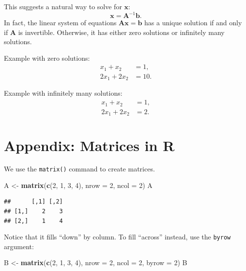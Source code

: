 \documentclass[12pt,oneside,openany]{book}
\newenvironment{Shaded}{\begin{snugshade}}{\end{snugshade}}
\newcommand{\KeywordTok}[1]{\textcolor[rgb]{0.13,0.29,0.53}{\textbf{{#1}}}}
\newcommand{\DataTypeTok}[1]{\textcolor[rgb]{0.13,0.29,0.53}{{#1}}}
\newcommand{\DecValTok}[1]{\textcolor[rgb]{0.00,0.00,0.81}{{#1}}}
\newcommand{\StringTok}[1]{\textcolor[rgb]{0.31,0.60,0.02}{{#1}}}
\newcommand{\NormalTok}[1]{{#1}}
\begin{document}
This suggests a natural way to solve for \(\mathbf{x}\):
\[\mathbf{x} = \mathbf{A}^{-1} \mathbf{b}.\] In fact, the linear system
of equations \(\mathbf{A} \mathbf{x} = \mathbf{b}\) has a unique
solution if and only if \(\mathbf{A}\) is invertible. Otherwise, it has
either zero solutions or infinitely many solutions.

Example with zero solutions: \[
\begin{aligned}
x_1 + x_2 &= 1, \\
2 x_1 + 2 x_2 &= 10.
\end{aligned}
\]

Example with infinitely many solutions: \[
\begin{aligned}
x_1 + x_2 &= 1, \\
2 x_1 + 2 x_2 &= 2.
\end{aligned}
\]

\section{Appendix: Matrices in R}\label{appendix-matrices-in-r}

We use the \texttt{matrix()} command to create matrices.

\begin{Shaded}
\begin{Highlighting}[]
\NormalTok{A <-}\StringTok{ }\KeywordTok{matrix}\NormalTok{(}\KeywordTok{c}\NormalTok{(}\DecValTok{2}\NormalTok{, }\DecValTok{1}\NormalTok{, }\DecValTok{3}\NormalTok{, }\DecValTok{4}\NormalTok{),}
            \DataTypeTok{nrow =} \DecValTok{2}\NormalTok{,}
            \DataTypeTok{ncol =} \DecValTok{2}\NormalTok{)}
\NormalTok{A}
\end{Highlighting}
\end{Shaded}

\begin{verbatim}
##      [,1] [,2]
## [1,]    2    3
## [2,]    1    4
\end{verbatim}

Notice that it fills ``down'' by column. To fill ``across'' instead, use
the \texttt{byrow} argument:

\begin{Shaded}
\begin{Highlighting}[]
\NormalTok{B <-}\StringTok{ }\KeywordTok{matrix}\NormalTok{(}\KeywordTok{c}\NormalTok{(}\DecValTok{2}\NormalTok{, }\DecValTok{1}\NormalTok{, }\DecValTok{3}\NormalTok{, }\DecValTok{4}\NormalTok{),}
            \DataTypeTok{nrow =} \DecValTok{2}\NormalTok{,}
            \DataTypeTok{ncol =} \DecValTok{2}\NormalTok{,}
            \DataTypeTok{byrow =} \DecValTok{2}\NormalTok{)}
\NormalTok{B}
\end{Highlighting}
\end{Shaded}
\end{document}
